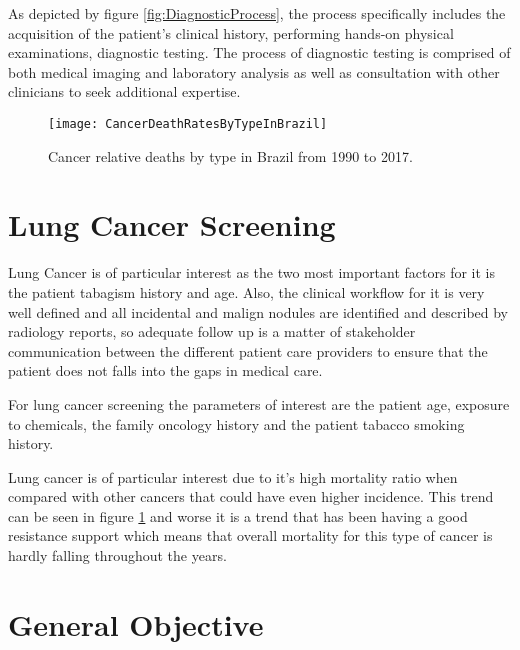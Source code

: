 As depicted by figure \ref{fig:DiagnosticProcess}, the process specifically includes the acquisition of the patient’s clinical history, performing hands-on physical examinations, diagnostic testing. The process of diagnostic testing is comprised of both medical imaging and laboratory analysis as well as consultation with other clinicians to seek additional expertise.

\begin{figure}
\begin{centering}
\texttt{[image: CancerDeathRatesByTypeInBrazil]}
\par\end{centering}
\caption{\label{fig:cancer_deaths_in_brazil}Cancer relative deaths by type in Brazil from 1990 to 2017.}

\end{figure}

\section{Lung Cancer Screening}

Lung Cancer is of particular interest as the two most important factors for it is the patient tabagism history and age\cite{fleischner2017}. Also, the clinical workflow for it is very well defined and all incidental and malign nodules are identified and described by radiology reports, so adequate follow up is a matter of stakeholder communication between the different patient care providers to ensure that the patient does not falls into the gaps in medical care. 

For lung cancer screening the parameters of interest are the patient age, exposure to chemicals, the family oncology history and the patient tabacco smoking history\cite{fleischner2017, parasuraman2000, jaklitsch2012}.

Lung cancer is of particular interest due to it's high mortality ratio when compared with other cancers that could have even higher incidence. This trend can be seen in figure \ref{fig:cancer_deaths_in_brazil} and worse it is a trend that has been having a good resistance support which means that overall mortality for this type of cancer is hardly falling throughout the years.

\section{General Objective}

